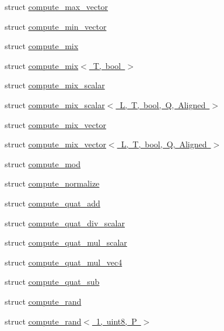 \begin{DoxyCompactItemize}
\item 
struct \mbox{\hyperlink{structglm_1_1detail_1_1compute__max__vector}{compute\+\_\+max\+\_\+vector}}
\item 
struct \mbox{\hyperlink{structglm_1_1detail_1_1compute__min__vector}{compute\+\_\+min\+\_\+vector}}
\item 
struct \mbox{\hyperlink{structglm_1_1detail_1_1compute__mix}{compute\+\_\+mix}}
\item 
struct \mbox{\hyperlink{structglm_1_1detail_1_1compute__mix_3_01_t_00_01bool_01_4}{compute\+\_\+mix$<$ T, bool $>$}}
\item 
struct \mbox{\hyperlink{structglm_1_1detail_1_1compute__mix__scalar}{compute\+\_\+mix\+\_\+scalar}}
\item 
struct \mbox{\hyperlink{structglm_1_1detail_1_1compute__mix__scalar_3_01_l_00_01_t_00_01bool_00_01_q_00_01_aligned_01_4}{compute\+\_\+mix\+\_\+scalar$<$ L, T, bool, Q, Aligned $>$}}
\item 
struct \mbox{\hyperlink{structglm_1_1detail_1_1compute__mix__vector}{compute\+\_\+mix\+\_\+vector}}
\item 
struct \mbox{\hyperlink{structglm_1_1detail_1_1compute__mix__vector_3_01_l_00_01_t_00_01bool_00_01_q_00_01_aligned_01_4}{compute\+\_\+mix\+\_\+vector$<$ L, T, bool, Q, Aligned $>$}}
\item 
struct \mbox{\hyperlink{structglm_1_1detail_1_1compute__mod}{compute\+\_\+mod}}
\item 
struct \mbox{\hyperlink{structglm_1_1detail_1_1compute__normalize}{compute\+\_\+normalize}}
\item 
struct \mbox{\hyperlink{structglm_1_1detail_1_1compute__quat__add}{compute\+\_\+quat\+\_\+add}}
\item 
struct \mbox{\hyperlink{structglm_1_1detail_1_1compute__quat__div__scalar}{compute\+\_\+quat\+\_\+div\+\_\+scalar}}
\item 
struct \mbox{\hyperlink{structglm_1_1detail_1_1compute__quat__mul__scalar}{compute\+\_\+quat\+\_\+mul\+\_\+scalar}}
\item 
struct \mbox{\hyperlink{structglm_1_1detail_1_1compute__quat__mul__vec4}{compute\+\_\+quat\+\_\+mul\+\_\+vec4}}
\item 
struct \mbox{\hyperlink{structglm_1_1detail_1_1compute__quat__sub}{compute\+\_\+quat\+\_\+sub}}
\item 
struct \mbox{\hyperlink{structglm_1_1detail_1_1compute__rand}{compute\+\_\+rand}}
\item 
struct \mbox{\hyperlink{structglm_1_1detail_1_1compute__rand_3_011_00_01uint8_00_01_p_01_4}{compute\+\_\+rand$<$ 1, uint8, P $>$}}

\end{DoxyCompactItemize}
